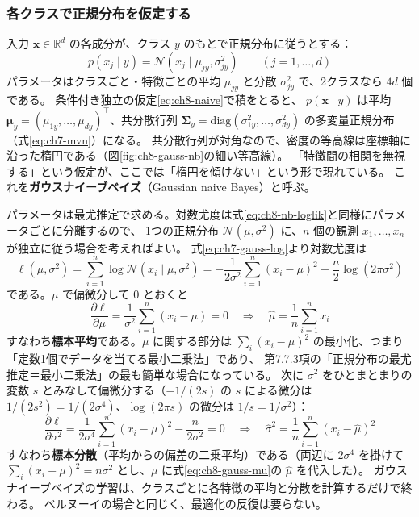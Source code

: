 \subsubsection{各クラスで正規分布を仮定する}

入力 $\bm{x} \in \mathbb{R}^d$ の各成分が、クラス $y$ のもとで正規分布に従うとする：
\begin{equation}
  p(x_j \mid y) = \mathcal{N}(x_j \mid \mu_{jy}, \sigma_{jy}^2)
  \qquad (j = 1, \ldots, d)
  \label{eq:ch8-gnb}
\end{equation}
パラメータはクラスごと・特徴ごとの平均 $\mu_{jy}$ と分散 $\sigma_{jy}^2$ で、2クラスなら $4d$ 個である。
条件付き独立の仮定\eqref{eq:ch8-naive}で積をとると、
$p(\bm{x} \mid y)$ は平均 $\bm{\mu}_y = (\mu_{1y}, \ldots, \mu_{dy})^\top$、共分散行列 $\bm{\Sigma}_y = \mathrm{diag}(\sigma_{1y}^2, \ldots, \sigma_{dy}^2)$ の多変量正規分布（式\eqref{eq:ch7-mvn}）になる。
共分散行列が対角なので、密度の等高線は座標軸に沿った楕円である（図\ref{fig:ch8-gauss-nb}の細い等高線）。
「特徴間の相関を無視する」という仮定が、ここでは「楕円を傾けない」という形で現れている。
これを\textbf{ガウスナイーブベイズ}（Gaussian naive Bayes）と呼ぶ。

パラメータは最尤推定で求める。対数尤度は式\eqref{eq:ch8-nb-loglik}と同様にパラメータごとに分離するので、
1つの正規分布 $\mathcal{N}(\mu, \sigma^2)$ に、$n$ 個の観測 $x_1, \ldots, x_n$ が独立に従う場合を考えればよい。
式\eqref{eq:ch7-gauss-log}より対数尤度は
\begin{equation}
  \ell(\mu, \sigma^2) = \sum_{i=1}^n \log \mathcal{N}(x_i \mid \mu, \sigma^2)
  = -\frac{1}{2\sigma^2}\sum_{i=1}^n (x_i - \mu)^2 - \frac{n}{2}\log(2\pi\sigma^2)
  \label{eq:ch8-gauss-loglik}
\end{equation}
である。$\mu$ で偏微分して $0$ とおくと
\begin{equation}
  \frac{\partial \ell}{\partial \mu} = \frac{1}{\sigma^2}\sum_{i=1}^n (x_i - \mu) = 0
  \quad\Longrightarrow\quad
  \hat{\mu} = \frac{1}{n}\sum_{i=1}^n x_i
  \label{eq:ch8-gauss-mu}
\end{equation}
すなわち\textbf{標本平均}である。$\mu$ に関する部分は $\sum_i (x_i - \mu)^2$ の最小化、つまり「定数1個でデータを当てる最小二乗法」であり、
第7.7.3項の「正規分布の最尤推定＝最小二乗法」の最も簡単な場合になっている。
次に $\sigma^2$ をひとまとまりの変数 $s$ とみなして偏微分する（$-1/(2s)$ の $s$ による微分は $1/(2s^2) = 1/(2\sigma^4)$、$\log(2\pi s)$ の微分は $1/s = 1/\sigma^2$）：
\begin{equation}
  \frac{\partial \ell}{\partial \sigma^2} = \frac{1}{2\sigma^4}\sum_{i=1}^n (x_i - \mu)^2 - \frac{n}{2\sigma^2} = 0
  \quad\Longrightarrow\quad
  \hat{\sigma}^2 = \frac{1}{n}\sum_{i=1}^n (x_i - \hat{\mu})^2
  \label{eq:ch8-gauss-var}
\end{equation}
すなわち\textbf{標本分散}（平均からの偏差の二乗平均）である（両辺に $2\sigma^4$ を掛けて $\sum_i (x_i - \mu)^2 = n\sigma^2$ とし、$\mu$ に式\eqref{eq:ch8-gauss-mu}の $\hat{\mu}$ を代入した）。
ガウスナイーブベイズの学習は、クラスごとに各特徴の平均と分散を計算するだけで終わる。
ベルヌーイの場合と同じく、最適化の反復は要らない。

